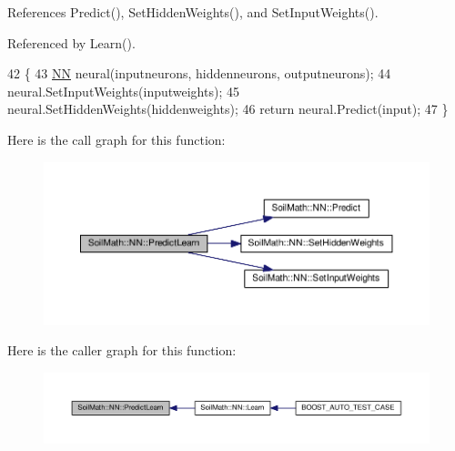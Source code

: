 References Predict(), Set\+Hidden\+Weights(), and Set\+Input\+Weights().



Referenced by Learn().


\begin{DoxyCode}
42                                                                            \{
43   \hyperlink{class_soil_math_1_1_n_n_a778606ea8a193479da233a030d1df234}{NN} neural(inputneurons, hiddenneurons, outputneurons);
44   neural.SetInputWeights(inputweights);
45   neural.SetHiddenWeights(hiddenweights);
46   \textcolor{keywordflow}{return} neural.Predict(input);
47 \}
\end{DoxyCode}


Here is the call graph for this function\+:\nopagebreak
\begin{figure}[H]
\begin{center}
\leavevmode
\includegraphics[width=350pt]{class_soil_math_1_1_n_n_ac758bdef758439af30a62c486dff79ca_cgraph}
\end{center}
\end{figure}




Here is the caller graph for this function\+:\nopagebreak
\begin{figure}[H]
\begin{center}
\leavevmode
\includegraphics[width=350pt]{class_soil_math_1_1_n_n_ac758bdef758439af30a62c486dff79ca_icgraph}
\end{center}
\end{figure}


\hypertarget{class_soil_math_1_1_n_n_ac01bcc755578095ebf1f1f0e951f2678}{}
